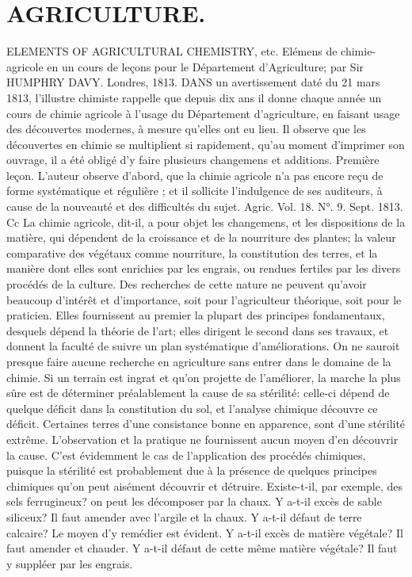 \setcounter{page}{329} \section{AGRICULTURE.}
ELEMENTS OF AGRICULTURAL CHEMISTRY, etc. Elémens de chimie-agricole en un cours de leçons pour le Département d'Agriculture; par Sir HUMPHRY DAVY. Londres, 1813.
DANS un avertissement daté du 21 mars 1813, l'illustre chimiste rappelle que depuis dix ans il donne chaque année un cours de chimie agricole à l'usage du Département d'agriculture, en faisant usage des découvertes modernes, à mesure qu'elles ont eu lieu. Il observe que les découvertes en chimie se multiplient si rapidement, qu'au moment d'imprimer son ouvrage, il a été obligé d'y faire plusieurs changemens et additions.
Première leçon.
L'auteur observe d'abord, que la chimie agricole n'a pas encore reçu de forme systématique et régulière ; et il sollicite l'indulgence de ses auditeurs, à cause de la nouveauté et des difficultés du sujet.
Agric. Vol. 18. N°. 9. Sept. 1813. Cc\setcounter{page}{330} La chimie agricole, dit-il, a pour objet les changemens, et les dispositions de la matière, qui dépendent de la croissance et de la nourriture des plantes; la valeur comparative des végétaux comme nourriture, la constitution des terres, et la manière dont elles sont enrichies par les engrais, ou rendues fertiles par les divers procédés de la culture. Des recherches de cette nature ne peuvent qu’avoir beaucoup d’intérêt et d’importance, soit pour l’agriculteur théorique, soit pour le praticien. Elles fournissent au premier la plupart des principes fondamentaux, desquels dépend la théorie de l’art; elles dirigent le second dans ses travaux, et donnent la faculté de suivre un plan systématique d’améliorations. On ne sauroit presque faire aucune recherche en agriculture sans entrer dans le domaine de la chimie. Si un terrain est ingrat et qu’on projette de l’améliorer, la marche la plus sûre est de déterminer préalablement la cause de sa stérilité: celle-ci dépend de quelque déficit dans la constitution du sol, et l’analyse chimique découvre ce déficit. Certaines terres d’une consistance bonne en apparence, sont d’une stérilité extrême. L’observation et la pratique ne fournissent\setcounter{page}{331} aucun moyen d’en découvrir la cause. C’est évidemment le cas de l’application des procédés chimiques, puisque la stérilité est probablement due à la présence de quelques principes chimiques qu’on peut aisément découvrir et détruire. Existe-t-il, par exemple, des sels ferrugineux? on peut les décomposer par la chaux. Y a-t-il excès de sable siliceux? Il faut amender avec l’argile et la chaux. Y a-t-il défaut de terre calcaire? Le moyen d’y remédier est évident. Y a-t-il excès de matière végétale? Il faut amender et chauder. Y a-t-il défaut de cette même matière végétale? Il faut y suppléer par les engrais.
